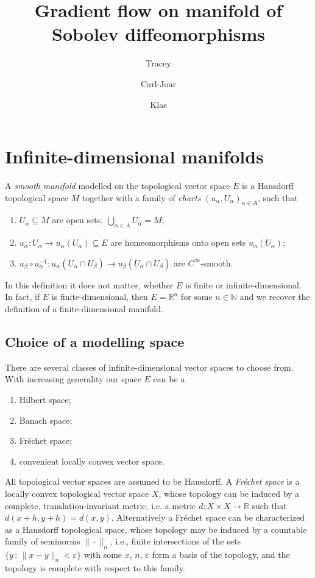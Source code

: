 \documentclass[a5paper,10pt,twoside]{article}
\title{Gradient flow on manifold of Sobolev diffeomorphisms}
\author{Tracey\and Carl-Joar \and Klas}
\newcommand{\N}{\ensuremath{\mathbb{N}}}
\newcommand{\R}{\ensuremath{\mathbb{R}}}
\newcommand{\eps}{\varepsilon}
\theoremstyle{plain}
\theoremstyle{definition}
\theoremstyle{remark}
\begin{document}
\maketitle
\tableofcontents
\thispagestyle{empty}
\setcounter{page}{0}
\newpage
	
\section{Infinite-dimensional manifolds}
A \emph{smooth manifold} modelled on the topological vector space $E$ is a Hausdorff topological space $M$ together with a family of \emph{charts} $(u_\alpha, U_\alpha)_{\alpha \in A}$, such that
\begin{enumerate}
	\item
	$U_\alpha \subseteq M$ are open sets, $\bigcup_{\alpha \in A} U_\alpha = M$;
	\item
	$u_\alpha : U_\alpha \to u_\alpha(U_\alpha) \subseteq E$ are homeomorphisms onto open sets $u_\alpha(U_\alpha)$;
	\item \label{eq:charts_smooth}
	$u_\beta \circ u_\alpha^{-1} : u_\alpha(U_\alpha \cap U_\beta) \to u_\beta(U_\alpha \cap U_\beta)$ are $C^\infty$-smooth.
\end{enumerate}

In this definition it does not matter, whether $E$ is finite or infinite-dimensional. In fact, if $E$ is finite-dimensional, then $E = \R^n$ for some $n \in \N$ and we recover the definition of a finite-dimensional manifold.

\subsection{Choice of a modelling space}

There are several classes of infinite-di\-men\-sio\-nal vector spaces to choose from. With increasing generality our space $E$ can be a
\begin{enumerate}
	\item Hilbert space;
	\item Banach space;
	\item Fr\'echet space;
	\item convenient locally convex vector space.
\end{enumerate}
%
All topological vector spaces are assumed to be Hausdorff. A \emph{Fr\'echet space} is a locally convex topological vector space $X$, whose topology can be induced by a complete, translation-invariant metric, i.e. a metric $d :X\times X \to \R$ such that $d(x+h,y+h)=d(x,y)$. Alternatively a Fr\'echet space can be characterized as a Hausdorff topological space, whose topology may be induced by a countable family of seminorms $\|\cdot\|_n$, i.e., finite intersections of the sets $\{ y \,:\, \| x - y \|_n < \eps\}$ with some $x$, $n$, $\eps$ form a basis of the topology, and the topology is complete with respect to this family.
\end{document}
